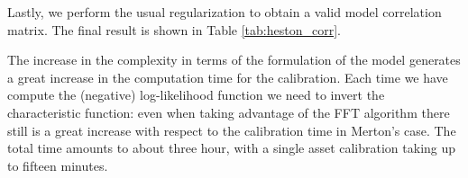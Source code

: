 Lastly, we perform the usual regularization to obtain a valid model correlation matrix.
The final result is shown in Table \ref{tab:heston_corr}.

The increase in the complexity in terms of the formulation of the model generates a great increase in the computation time for the calibration. Each time we have compute the (negative) log-likelihood function we need to invert the characteristic function: even when taking advantage of the FFT algorithm there still is a great increase with respect to the calibration time in Merton's case. The total time amounts to about three hour, with a single asset calibration taking up to fifteen minutes.

\begin{table}
	\tiny
  \centering
  \caption[Heston correlation matrix]{Resulting correlation matrix for Heston. The values are percentages and the colour scheme is the usual.}
    \noindent{}
\end{table}
